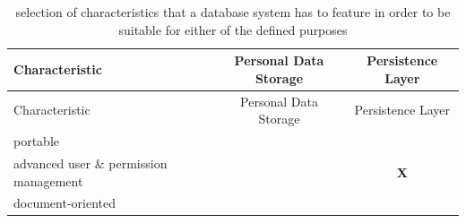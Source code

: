 \documentclass[12pt,english,a4paper,titlepage,cleardoublepage=empty,dottedtoc]{report}
\begin{document}
\begin{longtable}[]{@{}lcc@{}}
\caption{selection of characteristics that a database system has to
feature in order to be suitable for either of the defined purposes
\label{tbl:dbs-features}}\tabularnewline
\toprule
\begin{minipage}[b]{0.37\columnwidth}\raggedright\strut
Characteristic\strut
\end{minipage} & \begin{minipage}[b]{0.20\columnwidth}\centering\strut
Personal Data Storage\strut
\end{minipage} & \begin{minipage}[b]{0.16\columnwidth}\centering\strut
Persistence Layer\strut
\end{minipage}\tabularnewline
\midrule
\endfirsthead
\toprule
\begin{minipage}[b]{0.37\columnwidth}\raggedright\strut
Characteristic\strut
\end{minipage} & \begin{minipage}[b]{0.20\columnwidth}\centering\strut
Personal Data Storage\strut
\end{minipage} & \begin{minipage}[b]{0.16\columnwidth}\centering\strut
Persistence Layer\strut
\end{minipage}\tabularnewline
\midrule
\endhead
\begin{minipage}[t]{0.32\columnwidth}\raggedright\strut
portable\strut
\end{minipage} & \begin{minipage}[t]{0.32\columnwidth}\centering\strut
\strut
\end{minipage} & \begin{minipage}[t]{0.32\columnwidth}\centering\strut
\strut
\end{minipage}\tabularnewline
\begin{minipage}[t]{0.32\columnwidth}\raggedright\strut
advanced user \& permission management\strut
\end{minipage} & \begin{minipage}[t]{0.32\columnwidth}\centering\strut
\strut
\end{minipage} & \begin{minipage}[t]{0.32\columnwidth}\centering\strut
\textbf{X}\strut
\end{minipage}\tabularnewline
\begin{minipage}[t]{0.37\columnwidth}\raggedright\strut
document-oriented\strut
\end{minipage} & \begin{minipage}[t]{0.20\columnwidth}\centering\strut

\end{minipage}
\end{longtable}
\end{document}
